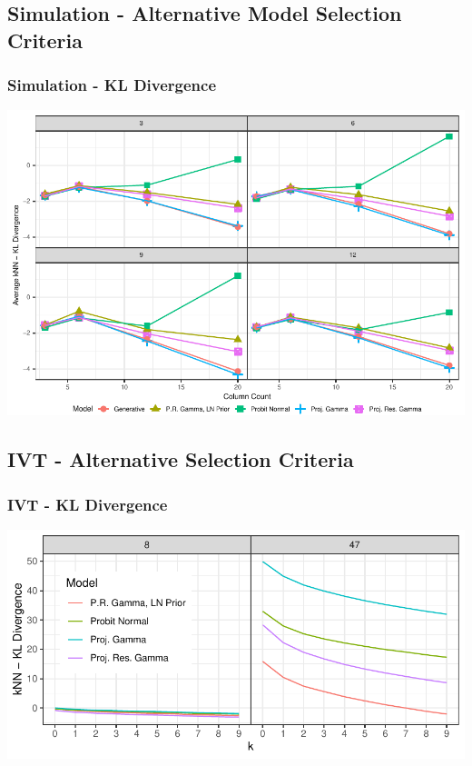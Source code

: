 \documentclass[aspectratio=169]{beamer}
\newlength{\frametextheight}
\begin{document}
\subsection*{Simulation - Alternative Model Selection Criteria}


\begin{frame}
  \frametitle{Simulation - KL Divergence}
  \begin{center}
    \includegraphics[height=\frametextheight]{./images/simulation_knn_kld}
  \end{center}
\end{frame}

\subsection*{IVT - Alternative Selection Criteria}

\begin{frame}
  \frametitle{IVT - KL Divergence}
  \begin{center}
    \includegraphics[height=\frametextheight]{./images/knn_kld}
  \end{center}
\end{frame}
\end{document}
